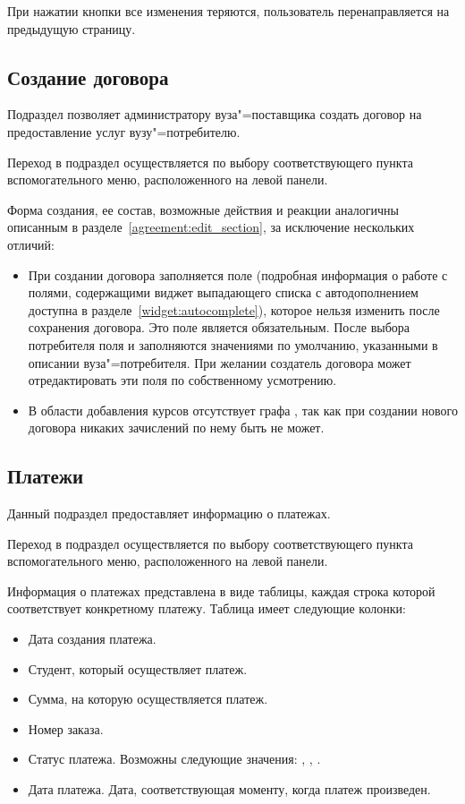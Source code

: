 При нажатии кнопки  все изменения теряются, пользователь перенаправляется на предыдущую страницу.


\subsection{Создание договора}
Подраздел позволяет администратору вуза"=поставщика создать договор на предоставление услуг вузу"=потребителю.

Переход в подраздел осуществляется по выбору соответствующего пункта вспомогательного меню, расположенного на левой панели.

Форма создания, ее состав, возможные действия и реакции аналогичны описанным в разделе~\ref{agreement:edit_section}, за исключение нескольких отличий:
\begin{itemize}
	\item При создании договора заполняется поле  (подробная информация о работе с полями, содержащими виджет выпадающего списка с автодополнением доступна в разделе~\ref{widget:autocomplete}), которое нельзя изменить после сохранения договора. Это поле является обязательным. После выбора потребителя поля  и  заполняются значениями по умолчанию, указанными в описании вуза"=потребителя. 
	При желании создатель договора может отредактировать эти поля по собственному усмотрению.
	\item В области добавления курсов отсутствует графа , так как при создании нового договора никаких зачислений по нему быть не может.
\end{itemize}

\subsection{Платежи}
Данный подраздел предоставляет информацию о платежах.

Переход в подраздел осуществляется по выбору соответствующего пункта вспомогательного меню, расположенного на левой панели.

Информация о платежах представлена в виде таблицы, каждая строка которой соответствует конкретному платежу. 
Таблица имеет следующие колонки:
\begin{itemize}
	\item Дата создания платежа.
	\item Студент, который осуществляет платеж.
	\item Сумма, на которую осуществляется платеж.
	\item Номер заказа.
	\item Статус платежа. Возможны следующие значения: , , .
	\item Дата платежа. Дата, соответствующая моменту, когда платеж произведен.
\end{itemize}

